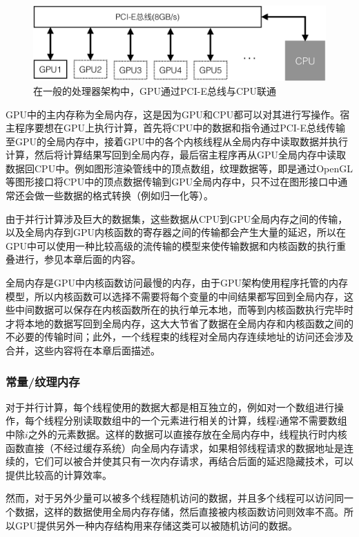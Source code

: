 \begin{figure}
\sidecaption
	\includegraphics[width=.65\textwidth]{figures/rp/pci-e}
	\caption{在一般的处理器架构中，GPU通过PCI-E总线与CPU联通}
	\label{f:rp-pci-e}
\end{figure}

GPU中的主内存称为全局内存，这是因为GPU和CPU都可以对其进行写操作。宿主程序要想在GPU上执行计算，首先将CPU中的数据和指令通过PCI-E总线传输至GPU的全局内存中，接着GPU中的各个内核线程从全局内存中读取数据并执行计算，然后将计算结果写回到全局内存，最后宿主程序再从GPU全局内存中读取数据回CPU中。例如图形渲染管线中的顶点数组，纹理数据等，即是通过OpenGL等图形接口将CPU中的顶点数据传输到GPU全局内存中，只不过在图形接口中通常还会做一些数据的格式转换（例如归一化等）。

由于并行计算涉及巨大的数据集，这些数据从CPU到GPU全局内存之间的传输，以及全局内存到GPU内核函数的寄存器之间的传输都会产生大量的延迟，所以在GPU中可以使用一种比较高级的流传输的模型来使传输数据和内核函数的执行重叠进行，参见本章后面的内容。

全局内存是GPU中内核函数访问最慢的内存，由于GPU架构使用程序托管的内存模型，所以内核函数可以选择不需要将每个变量的中间结果都写回到全局内存，这些中间数据可以保存在内核函数所在的执行单元本地，而等到内核函数执行完毕时才将本地的数据写回到全局内存，这大大节省了数据在全局内存和内核函数之间的不必要的传输时间；此外，一个线程束的线程对全局内存连续地址的访问还会涉及合并，这些内容将在本章后面描述。





\subsubsection{常量/纹理内存}
对于并行计算，每个线程使用的数据大都是相互独立的，例如对一个数组进行操作，每个线程分别读取数组中的一个元素进行相关的计算，线程$i$通常不需要数组中除$i$之外的元素数据。这样的数据可以直接存放在全局内存中，线程执行时内核函数直接（不经过缓存系统）向全局内存请求，如果相邻线程请求的数据地址是连续的，它们可以被合并使其只有一次内存请求，再结合后面的延迟隐藏技术，可以提供比较高的计算效率。

然而，对于另外少量可以被多个线程随机访问的数据，并且多个线程可以访问同一个数据，这样的数据使用全局内存存储，然后直接被内核函数访问则效率不高。所以GPU提供另外一种内存结构用来存储这类可以被随机访问的数据。

